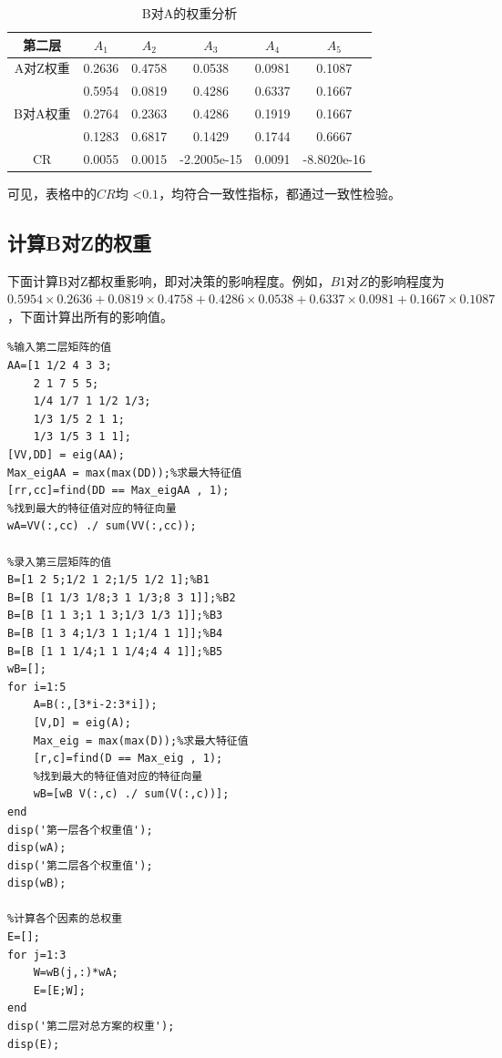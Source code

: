 \documentclass{ctexart}
\begin{document}
\begin{table}[h!]
    \centering
    \begin{tabular}{c|c|c|c|c|c}
    \hline
         第二层&  $A_{1}$ & $A_{2}$ & $A_{3}$ & $A_{4}$& $A_{5}$ \\
         \hline
         A对Z权重 &0.2636 &0.4758 &0.0538 &0.0981 &0.1087\\
         \hline
         \multirow{3}{*}{B对A权重}
         &0.5954 &0.0819 &0.4286 &0.6337 &0.1667\\
         &0.2764 &0.2363 &0.4286 &0.1919 &0.1667\\
         &0.1283 &0.6817 &0.1429 &0.1744 &0.6667\\
         \hline
         CR &0.0055 &0.0015 &-2.2005e-15 &0.0091 &-8.8020e-16\\
         \hline
    \end{tabular}
    \caption{B对A的权重分析}
    \label{表：6}
\end{table}

可见，表格中的$CR$均 \textless $0.1$，均符合一致性指标，都通过一致性检验。



\subsection{计算B对Z的权重}
下面计算B对Z都权重影响，即对决策的影响程度。例如，$B1$对$Z$的影响程度为$0.5954 \times 0.2636 + 0.0819 \times 0.4758 + 0.4286 \times 0.0538 + 0.6337 \times 0.0981 + 0.1667 \times 0.1087$，下面计算出所有的影响值。

\begin{lstlisting}
%输入第二层矩阵的值
AA=[1 1/2 4 3 3;
    2 1 7 5 5;
    1/4 1/7 1 1/2 1/3;
    1/3 1/5 2 1 1;
    1/3 1/5 3 1 1];
[VV,DD] = eig(AA);
Max_eigAA = max(max(DD));%求最大特征值
[rr,cc]=find(DD == Max_eigAA , 1);
%找到最大的特征值对应的特征向量
wA=VV(:,cc) ./ sum(VV(:,cc));

%录入第三层矩阵的值
B=[1 2 5;1/2 1 2;1/5 1/2 1];%B1
B=[B [1 1/3 1/8;3 1 1/3;8 3 1]];%B2
B=[B [1 1 3;1 1 3;1/3 1/3 1]];%B3
B=[B [1 3 4;1/3 1 1;1/4 1 1]];%B4
B=[B [1 1 1/4;1 1 1/4;4 4 1]];%B5
wB=[];
for i=1:5
    A=B(:,[3*i-2:3*i]);
    [V,D] = eig(A);
    Max_eig = max(max(D));%求最大特征值
    [r,c]=find(D == Max_eig , 1);
    %找到最大的特征值对应的特征向量
    wB=[wB V(:,c) ./ sum(V(:,c))];
end
disp('第一层各个权重值');
disp(wA);
disp('第二层各个权重值');
disp(wB);

%计算各个因素的总权重
E=[];
for j=1:3
    W=wB(j,:)*wA;
    E=[E;W];
end
disp('第二层对总方案的权重');
disp(E);
\end{lstlisting}
\end{document}
